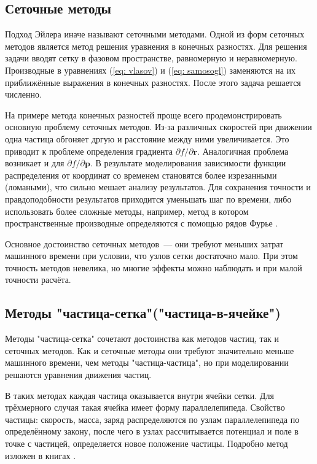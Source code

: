 \documentclass[a4paper,14pt]{extreport} %
\newcommand{\dsl}[2]{{\partial #1}/{\partial #2}}
\renewcommand{\vec}[1]{\bm{#1}}
\begin{document}
\subsection{Сеточные методы}

Подход Эйлера иначе называют сеточными методами. Одной из форм сеточных методов является метод решения уравнения в конечных разностях. Для решения задачи вводят сетку в фазовом пространстве, равномерную и неравномерную. Производные в уравнениях (\ref{eq: vlasov}) и (\ref{eq: samosogl}) заменяются на их приближённые выражения в конечных разностях. После этого задача решается численно.

На примере метода конечных разностей проще всего продемонстрировать основную проблему сеточных методов. Из-за различных скоростей при движении одна частица обгоняет дргую и расстояние между ними увеличивается. Это приводит к проблеме определения градиента $\dsl{f}{\vec{r}}$. Аналогичная проблема возникает и для $\dsl{f}{\vec{p}}$. В результате моделирования зависимости функции распределения от координат со временем становятся более изрезанными (ломаными), что сильно мешает анализу результатов. Для сохранения точности и правдоподобности результатов приходится уменьшать шаг по времени, либо использовать более сложные методы, например, метод в котором пространственные производные определяются с помощью рядов Фурье \cite{Roshal}.

Основное достоинство сеточных методов~--- они требуют меньших затрат машинного времени при условии, что узлов сетки достаточно мало. При этом точность методов невелика, но многие эффекты можно наблюдать и при малой точности расчёта.

\subsection{Методы "частица-сетка"("частица-в-ячейке")}

Методы "частица-сетка" сочетают достоинства как методов частиц, так и сеточных методов. Как и сеточные методы они требуют значительно меньше машинного времени, чем методы "частица-частица", но при моделировании решаются уравнения движения частиц.

В таких методах каждая частица оказывается внутри ячейки сетки. Для трёхмерного случая такая ячейка имеет форму параллелепипеда. Свойство частицы: скорость, масса, заряд распределяются по узлам параллелепипеда по определённому закону, после чего в узлах рассчитывается потенциал и поле в точке с частицей, определяется новое положение частицы. Подробно метод изложен в книгах \cite{Grigoriev, PIC}.
\end{document}
